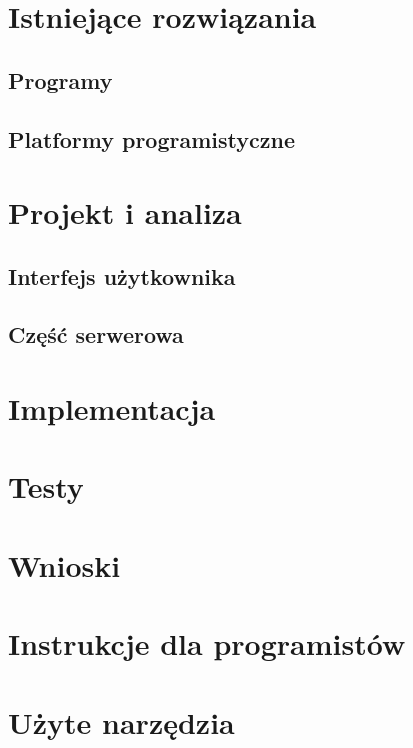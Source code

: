 \documentclass[a4paper,12pt]{report}
\begin{document}
\chapter{Istniejące rozwiązania}
\section{Programy}
\section{Platformy programistyczne}

\chapter{Projekt i analiza}
\section{Interfejs użytkownika}
\section{Część serwerowa}

\chapter{Implementacja}

\chapter{Testy}

\chapter{Wnioski}

\appendix
\chapter{Instrukcje dla programistów}
\chapter{Użyte narzędzia}
\end{document}
